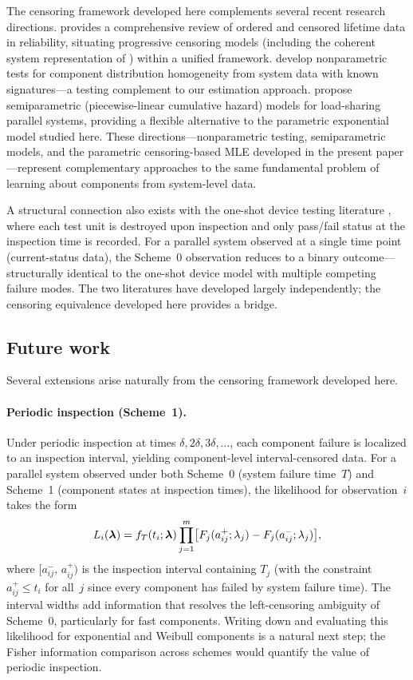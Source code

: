 The censoring framework developed here complements several recent
research directions.  \citet{Cramer2023} provides a comprehensive
review of ordered and censored lifetime data in reliability, situating
progressive censoring models (including the coherent system
representation of \citealt{CramerNavarro2015}) within a unified
framework.  \citet{QuNgMoon2024a,QuNgMoon2024b} develop nonparametric
tests for component distribution homogeneity from system data with known
signatures---a testing complement to our estimation approach.
\citet{BiswasGangulyMitra2025} propose semiparametric (piecewise-linear
cumulative hazard) models for load-sharing parallel systems, providing a
flexible alternative to the parametric exponential model studied here.
These directions---nonparametric testing, semiparametric models, and the
parametric censoring-based MLE developed in the present paper---represent
complementary approaches to the same fundamental problem of learning
about components from system-level data.

A structural connection also exists with the one-shot device testing
literature \citep{BalakrishnanSo2025}, where each test unit is
destroyed upon inspection and only pass/fail status at the inspection
time is recorded.  For a parallel system observed at a single time
point (current-status data), the Scheme~0 observation reduces to a
binary outcome---structurally identical to the one-shot device model
with multiple competing failure modes.  The two literatures have
developed largely independently; the censoring equivalence developed
here provides a bridge.

\subsection{Future work}

Several extensions arise naturally from the censoring framework
developed here.

\paragraph{Periodic inspection (Scheme~1).}
Under periodic inspection at times $\delta, 2\delta, 3\delta, \ldots$,
each component failure is localized to an inspection interval, yielding
component-level interval-censored data.  For a parallel system observed
under both Scheme~0 (system failure time~$T$) and Scheme~1 (component
states at inspection times), the likelihood for observation~$i$ takes
the form
\[
  L_i(\boldsymbol{\lambda}) = f_T(t_i;\boldsymbol{\lambda}) \prod_{j=1}^{m}
    \bigl[F_j(a_{ij}^+;\lambda_j) - F_j(a_{ij}^-;\lambda_j)\bigr],
\]
where $[a_{ij}^-,\, a_{ij}^+)$ is the inspection interval containing
$T_j$ (with the constraint $a_{ij}^+ \leq t_i$ for all~$j$ since
every component has failed by system failure time).  The interval
widths add information that resolves the left-censoring ambiguity of
Scheme~0, particularly for fast components.  Writing down and
evaluating this likelihood for exponential and Weibull components is a
natural next step; the Fisher information comparison across schemes
would quantify the value of periodic inspection.

